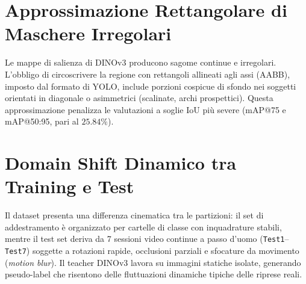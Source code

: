 \section{Approssimazione Rettangolare di Maschere Irregolari}
\label{sec:limiti_rettangolo}
Le mappe di salienza di DINOv3 producono sagome continue e irregolari. L'obbligo di circoscrivere la regione con rettangoli allineati agli assi (AABB), imposto dal formato di YOLO, include porzioni cospicue di sfondo nei soggetti orientati in diagonale o asimmetrici (scalinate, archi prospettici). Questa approssimazione penalizza le valutazioni a soglie IoU più severe (mAP@75 e mAP@50:95, pari al $25.84\%$).

\section{Domain Shift Dinamico tra Training e Test}
\label{sec:limiti_domain_shift}
Il dataset presenta una differenza cinematica tra le partizioni: il set di addestramento è organizzato per cartelle di classe con inquadrature stabili, mentre il test set deriva da 7 sessioni video continue a passo d'uomo (\texttt{Test1}--\texttt{Test7}) soggette a rotazioni rapide, occlusioni parziali e sfocature da movimento (\textit{motion blur}). Il teacher DINOv3 lavora su immagini statiche isolate, generando pseudo-label che risentono delle fluttuazioni dinamiche tipiche delle riprese reali.
